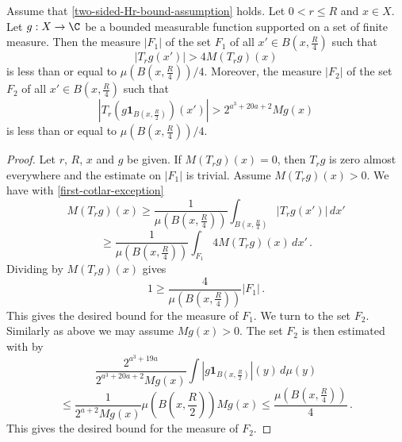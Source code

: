 \begin{lemma}
\label{Cotlar-sets}
\leanok
{}
Assume that \eqref{two-sided-Hr-bound-assumption} holds. Let $0<r\le R$ and  $x\in X$. Let $g:X\to\C$ be a bounded measurable function supported on a set of finite measure.
Then the measure $|F_1|$ of the set $F_1$ of all $x'\in B(x,\frac {R} 4)$ such that
\begin{equation}
\label{first-cotlar-exception}
    |T_rg(x')|> 4 M(T_rg)(x)
\end{equation}
is less than or equal to $\mu(B(x,\frac{R}{4}))/4$.
Moreover,  the measure $|F_2|$ of the set $F_2$ of all $x'\in
B(x,\frac {R} 4)$ such that
\begin{equation}
\label{second-cotlar-exception}
    |T_r(g\mathbf{1}_{B(x,\frac {R} 2)})(x')| > 2^{a^3 + 20a + 2} Mg(x)
\end{equation}
is less than or equal to  $\mu(B(x,\frac{R}{4}))/4$.
\end{lemma}

\begin{proof}
\leanok
Let $r$, $R$, $x$ and $g$ be given.
If $M(T_rg)(x)=0$, then $T_rg$ is zero almost everywhere and the estimate on $|F_1|$ is trivial.
Assume $M(T_rg)(x)>0$.
We have with \eqref{first-cotlar-exception}
\begin{equation}
    M(T_rg)(x)\ge
    \frac 1{\mu(B(x,\frac{R}{4}))}\int_{B(x,\frac{R}{4})}|T_rg(x')|\, dx'
\end{equation}
\begin{equation}
    \ge
    \frac 1{\mu(B(x,\frac{R}{4}))}\int_{F_1} 4 M(T_rg)(x)\, dx' \,.
\end{equation}
Dividing by $M(T_rg)(x)$ gives
\begin{equation}
    1\ge \frac{4}{\mu(B(x,\frac{R}{4}))} |F_1|\, .
\end{equation}
This gives the desired bound for the measure of $F_1$.
We turn to the set $F_2$. Similarly as above we may assume $Mg(x)>0$.
The set $F_2$ is then estimated with  by
\begin{equation}
   \frac {2^{a^3+19a}}{2^{a^3 + 20a + 2}Mg(x)}\int |g\mathbf{1}_{B(x,\frac {R}2)}|(y)\, d\mu(y)
\end{equation}
\begin{equation}
   \le \frac {1}{2^{a+2} Mg(x)}\mu(B(x,\frac {R}{2})) Mg(x) \le \frac{\mu(B(x,\frac {R}{4}))}{4} \,.
\end{equation}
This gives the desired bound for the measure of $F_2$.
\end{proof}

